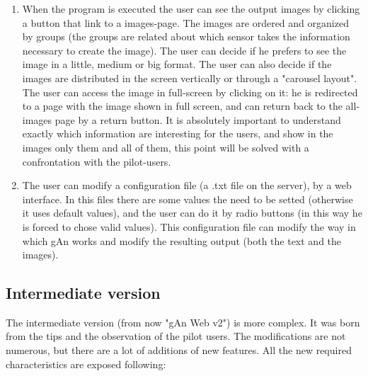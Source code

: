 \begin{enumerate}
\item When the program is executed the user can see the output images by clicking a button that link to a images-page. The images are ordered and organized by groups (the groups are related about which sensor takes the information necessary to create the image). The user can decide if he prefers to see the image in a little, medium or big format. The user can also decide if the images are distributed in the screen vertically or through a "carousel layout". The user can access the image in full-screen by clicking on it: he is redirected to a page with the image shown in full screen, and can return back to the all-images page by a return button. It is absolutely important to understand exactly which information are interesting for the users, and show in the images only them and all of them, this point will be solved with a confrontation with the pilot-users. 

\item The user can modify a configuration file (a .txt file on the server), by a web interface. In this files there are some values the need to be setted (otherwise it uses default values), and the user can do it by radio buttons (in this way he is forced to chose valid values). This configuration file can modify the way in which gAn works and modify the resulting output (both the text and the images).   

\end{enumerate}

\subsection{Intermediate version}
The intermediate version (from now "gAn Web v2") is more complex. It was born from the tips and the observation of the pilot users. The modifications are not numerous, but there are a lot of additions of new features. All the new required characteristics are exposed following:

